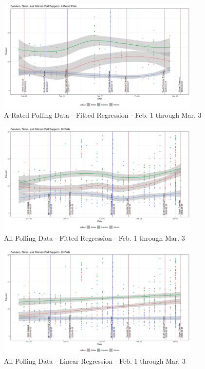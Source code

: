 \begin{figure}[H]
    \centering
    \includegraphics[width=0.9\textwidth]{figures/scatter-A-rated.png}
    \caption{A-Rated Polling Data - Fitted Regression - Feb. 1 through Mar. 3}
    \label{scatter-A-rated}
\end{figure}

\begin{figure}[H]
    \centering
    \includegraphics[width=0.9\textwidth]{figures/scatter-all.png}
    \caption{All Polling Data - Fitted Regression - Feb. 1 through Mar. 3}
    \label{scatter-all}
\end{figure}

\begin{figure}[H]
    \centering
    \includegraphics[width=0.9\textwidth]{figures/scatter-all-linear.png}
    \caption{All Polling Data - Linear Regression - Feb. 1 through Mar. 3}
    \label{scatter-all-linear}
\end{figure}

